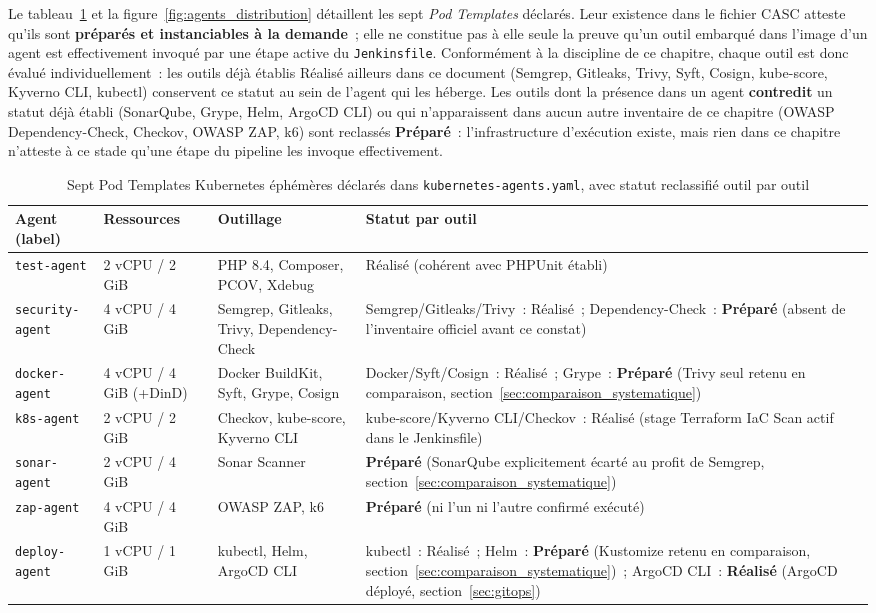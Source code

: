 Le tableau~\ref{tab:agents_casc} et la figure~\ref{fig:agents_distribution} détaillent les sept \textit{Pod Templates} déclarés. Leur existence dans le fichier CASC atteste qu'ils sont \textbf{préparés et instanciables à la demande}~; elle ne constitue pas à elle seule la preuve qu'un outil embarqué dans l'image d'un agent est effectivement invoqué par une étape active du \texttt{Jenkinsfile}. Conformément à la discipline de ce chapitre, chaque outil est donc évalué individuellement~: les outils déjà établis Réalisé ailleurs dans ce document (Semgrep, Gitleaks, Trivy, Syft, Cosign, kube-score, Kyverno CLI, kubectl) conservent ce statut au sein de l'agent qui les héberge. Les outils dont la présence dans un agent \textbf{contredit} un statut déjà établi (SonarQube, Grype, Helm, ArgoCD CLI) ou qui n'apparaissent dans aucun autre inventaire de ce chapitre (OWASP Dependency-Check, Checkov, OWASP ZAP, k6) sont reclassés \textbf{Préparé}~: l'infrastructure d'exécution existe, mais rien dans ce chapitre n'atteste à ce stade qu'une étape du pipeline les invoque effectivement.

\begin{table}[htbp]
\centering
\scriptsize
\begin{tabular}{@{}p{2.4cm}p{2.4cm}p{4.4cm}p{4.4cm}@{}}
\toprule
\textbf{Agent (label)} & \textbf{Ressources} & \textbf{Outillage} & \textbf{Statut par outil} \\
\midrule
\texttt{test-agent} & 2 vCPU / 2 GiB & PHP 8.4, Composer, PCOV, Xdebug & Réalisé (cohérent avec PHPUnit établi) \\
\texttt{security-agent} & 4 vCPU / 4 GiB & Semgrep, Gitleaks, Trivy, Dependency-Check & Semgrep/Gitleaks/Trivy~: Réalisé~; Dependency-Check~: \textbf{Préparé} (absent de l'inventaire officiel avant ce constat) \\
\texttt{docker-agent} & 4 vCPU / 4 GiB (+DinD) & Docker BuildKit, Syft, Grype, Cosign & Docker/Syft/Cosign~: Réalisé~; Grype~: \textbf{Préparé} (Trivy seul retenu en comparaison, section~\ref{sec:comparaison_systematique}) \\
\texttt{k8s-agent} & 2 vCPU / 2 GiB & Checkov, kube-score, Kyverno CLI & kube-score/Kyverno CLI/Checkov~: Réalisé (stage Terraform IaC Scan actif dans le Jenkinsfile) \\
\texttt{sonar-agent} & 2 vCPU / 4 GiB & Sonar Scanner & \textbf{Préparé} (SonarQube explicitement écarté au profit de Semgrep, section~\ref{sec:comparaison_systematique}) \\
\texttt{zap-agent} & 4 vCPU / 4 GiB & OWASP ZAP, k6 & \textbf{Préparé} (ni l'un ni l'autre confirmé exécuté) \\
\texttt{deploy-agent} & 1 vCPU / 1 GiB & kubectl, Helm, ArgoCD CLI & kubectl~: Réalisé~; Helm~: \textbf{Préparé} (Kustomize retenu en comparaison, section~\ref{sec:comparaison_systematique})~; ArgoCD CLI~: \textbf{Réalisé} (ArgoCD déployé, section~\ref{sec:gitops}) \\
\bottomrule
\end{tabular}
\caption{Sept Pod Templates Kubernetes éphémères déclarés dans \texttt{kubernetes-agents.yaml}, avec statut reclassifié outil par outil}
\label{tab:agents_casc}
\end{table}

